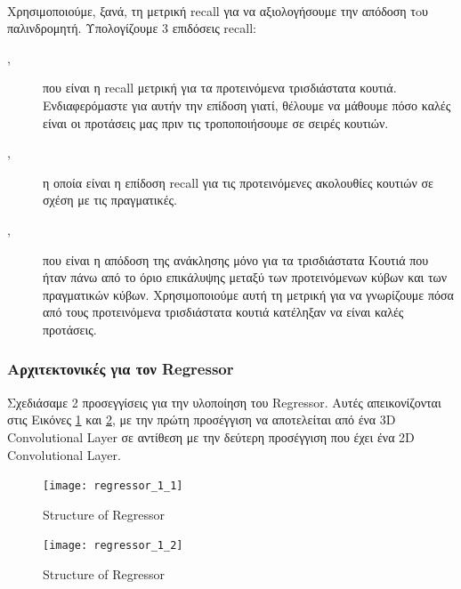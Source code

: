 \paragraph{}
Χρησιμοποιούμε, ξανά, τη μετρική \en recall \gr για να αξιολογήσουμε την απόδοση τoυ παλινδρομητή. Υπολογίζουμε 3 επιδόσεις \en recall\gr:
\begin{description}
\item [,] που είναι η \en recall \gr μετρική για τα προτεινόμενα τρισδιάστατα κουτιά. Ενδιαφερόμαστε για αυτήν την επίδοση γιατί,
  θέλουμε να μάθουμε πόσο καλές είναι οι προτάσεις μας πριν τις τροποποιήσουμε σε σειρές κουτιών.
\item [,] η οποία είναι η επίδοση \en recall \gr για τις προτεινόμενες ακολουθίες κουτιών σε σχέση με τις πραγματικές.
\item[,] που είναι η απόδοση της ανάκλησης μόνο για τα τρισδιάστατα Κουτιά που ήταν πάνω από το όριο επικάλυψης μεταξύ
  των προτεινόμενων κύβων και των πραγματικών κύβων. Χρησιμοποιούμε αυτή τη μετρική για να γνωρίζουμε πόσα από τους προτεινόμενα τρισδιάστατα κουτιά
  κατέληξαν να είναι καλές προτάσεις.
\end{description}


\subsubsection{Αρχιτεκτονικές για τον \en Regressor \gr} 
Σχεδιάσαμε 2 προσεγγίσεις για την υλοποίηση του \en Regressor\gr. Aυτές απεικονίζονται στις Εικόνες \ref{fig:gr_regressor_3d} και \ref{fig:gr_reg_1_2}, με την πρώτη προσέγγιση
να αποτελείται από ένα \en 3D Convolutional Layer \gr σε αντίθεση με την δεύτερη προσέγγιση που έχει ένα \en 2D Convolutional Layer\gr.

\en
\begin{figure}[h]
  \centering
  \texttt{[image: regressor\_1\_1]}
  \caption{\en Structure of Regressor}
  \label{fig:gr_regressor_3d}
\end{figure}
\gr
\en
\begin{figure}[h]
  \en
  \centering
  \texttt{[image: regressor\_1\_2]}
  \caption{\en Structure of Regressor}
  \label{fig:gr_reg_1_2}
\end{figure}
\gr

